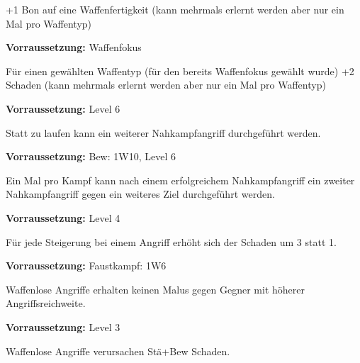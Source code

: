 \documentclass[../../Heldenanleitung2]{subfiles}
\begin{document}
\begin{multicols}{2}
\begin{tcolorbox}[title={Waffenfokus},colbacktitle=red, coltitle=black]    
   +1 Bon auf eine Waffenfertigkeit (kann mehrmals erlernt werden aber nur ein Mal pro Waffentyp)
\end{tcolorbox}

\begin{tcolorbox}[title={Waffenspezialisierung},colbacktitle=red, coltitle=black]  
	\textbf{Vorraussetzung:} Waffenfokus
	\vspace{0.2cm}
	  
   Für einen gewählten Waffentyp (für den bereits Waffenfokus gewählt wurde) +2 Schaden (kann mehrmals erlernt werden aber nur ein Mal pro Waffentyp)
\end{tcolorbox}

\begin{tcolorbox}[title={Doppelangriff},colbacktitle=red, coltitle=black]  
	\textbf{Vorraussetzung:} Level 6
	\vspace{0.2cm}
	  
   Statt zu laufen kann ein weiterer Nahkampfangriff durchgeführt werden.
\end{tcolorbox}

\begin{tcolorbox}[title={Flüssige Bewegung},colbacktitle=red, coltitle=black]  
	\textbf{Vorraussetzung:} Bew: 1W10, Level 6
	\vspace{0.2cm}
	  
   Ein Mal pro Kampf kann nach einem erfolgreichem Nahkampfangriff ein zweiter Nahkampfangriff gegen ein weiteres Ziel durchgeführt werden.
\end{tcolorbox}

\begin{tcolorbox}[title={Gezielte Treffer},colbacktitle=red, coltitle=black]  
	\textbf{Vorraussetzung:} Level 4
	\vspace{0.2cm}
	  
    Für jede Steigerung bei einem Angriff erhöht sich der Schaden um 3 statt 1.
\end{tcolorbox}

\begin{tcolorbox}[title={Waffenloser Kampf},colbacktitle=red, coltitle=black]	  
	\textbf{Vorraussetzung:} Faustkampf: 1W6
	\vspace{0.2cm}
	
    Waffenlose Angriffe erhalten keinen Malus gegen Gegner mit höherer Angriffsreichweite.
\end{tcolorbox}

\begin{tcolorbox}[title={Schnelle Schläge},colbacktitle=red, coltitle=black]	  
	\textbf{Vorraussetzung:} Level 3
	\vspace{0.2cm}
	  
    Waffenlose Angriffe verursachen Stä+Bew Schaden.
\end{tcolorbox}
\end{multicols}
\end{document}
